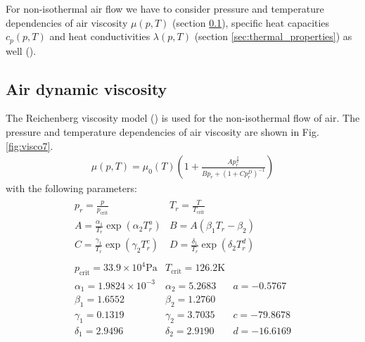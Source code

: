 For non-isothermal air flow we have to consider pressure and temperature dependencies of air viscosity $\mu(p, T)$ (section \ref{sec:Reichenberg_viscosity_model}), specific heat capacities $c_p(p, T)$ and heat conductivities $\lambda(p, T)$ (section \ref{sec:thermal_properties}) as well (\cite{McDermottEtAl:2006}).
\subsection{Air dynamic viscosity}
\label{sec:Reichenberg_viscosity_model}
The Reichenberg viscosity model (\cite{ReidEtAl:1988}) is used for the non-isothermal flow of air. The pressure and temperature dependencies of air viscosity are shown in Fig. \ref{fig:visco7}.
\begin{eqnarray}
\mu (p, T)=\mu_0 (T)\left(1 + \frac{A p_r^{\frac{3}{2}}}{B p_r+\left(1+C p_r^D\right)^{-1}}
\right)
\label{eqn:reichenberg_viscosity}
\end{eqnarray}
with the following parameters:
\begin{eqnarray}
\begin{array}{ll}
p_r = \frac{p}{p_{\mathrm {crit}}}
&
T_r = \frac{T}{T_{\mathrm {crit}}}
\\
A = \frac{\alpha_1}{T_r} \exp (\alpha_2 T_r^a)
&
B = A(\beta_1 T_r - \beta_2)
\\
C =\frac{\gamma_1}{T_r} \exp (\gamma_2 T_r^c)
&
D = \frac{\delta_1}{T_r} \exp (\delta_2 T_r^d)
\end{array}
\\
\begin{array}{lll}
p_{\mathrm {crit}} = 33.9 \times 10^4 \mathrm {Pa}
&
T_{\mathrm {crit}} = 126.2 \mathrm {K}
\\
\alpha_1 = 1.9824\times 10^{-3}  &  \alpha_2 = 5.2683  &  a = -0.5767 \\
\beta_1  = 1.6552               &  \beta_2  = 1.2760  &  \\
\gamma_1 = 0.1319                &  \gamma_2 = 3.7035  &  c = -79.8678 \\
\delta_1 = 2.9496                &  \delta_2 = 2.9190  &  d = -16.6169
\end{array}
\nonumber
\end{eqnarray}


